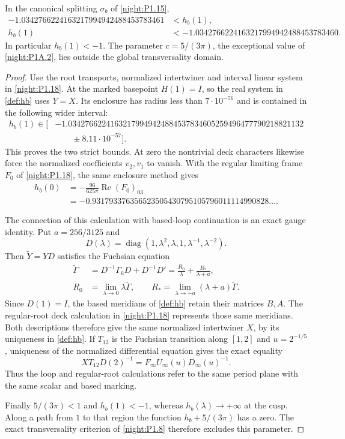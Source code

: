 \begin{theorem}
\hypertarget{tag-02QP}{}\label{night:P1.16}
In the canonical splitting $\sigma_b$ of \cref{night:P1.15},
\[
\begin{aligned}
-1.0342766224163217994942488453783461&<h_b(1),\\
h_b(1)&<-1.0342766224163217994942488453783460.
\end{aligned}
\]
In particular $h_b(1)<-1$. The parameter $c=5/(3\pi)$,
the exceptional value of \cref{night:P1A.2}, lies outside
the global transversality domain.
\end{theorem}
\begin{proof}
Use the root transports, normalized intertwiner and interval
linear system in \cref{night:P1.18}. At the marked basepoint
$H(1)=I$, so the real system in \cref{def:hb} uses $Y=X$.
Its enclosure has radius less than $7\cdot10^{-76}$ and is
contained in the following wider interval:
\[
\begin{aligned}
h_b(1)\in\bigl[&
-1.03427662241632179949424884537834605259496477790218821132\\
&\qquad\mathbin{\pm}8.11\cdot10^{-57}\bigr].
\end{aligned}
\]
This proves the two strict bounds. At zero the nontrivial deck
characters likewise force the normalized coefficients
$v_2,v_1$ to vanish. With the regular limiting frame $F_0$
of \cref{night:P1.18}, the same enclosure method gives
\[
\begin{aligned}
h_b(0)&=-\frac{96}{625\pi}\operatorname{Re}(F_0)_{03}\\
&=-0.931793376356523505430795105796011114990828\ldots .
\end{aligned}
\]

The connection of this calculation with based-loop continuation
is an exact gauge identity. Put $a=256/3125$ and
\[
D(\lambda)=\operatorname{diag}
 (1,\lambda^2,\lambda,1,\lambda^{-1},\lambda^{-2}).
\]
Then $\widetilde Y=YD$ satisfies the Fuchsian equation
\[
\begin{aligned}
\widetilde\Gamma
 &=D^{-1}\Gamma_6D+D^{-1}D'
 =\frac{R_0}{\lambda}+\frac{R_*}{\lambda+a},\\
R_0&=\lim_{\lambda\to0}\lambda\widetilde\Gamma,
\qquad
R_* =\lim_{\lambda\to-a}(\lambda+a)\widetilde\Gamma.
\end{aligned}
\]
Since $D(1)=I$, the based meridians of \cref{def:hb}
retain their matrices $B,A$. The regular-root deck calculation
in \cref{night:P1.18} represents those same meridians.
Both descriptions therefore give the same normalized
intertwiner $X$, by its uniqueness in \cref{def:hb}.
If $T_{12}$ is the Fuchsian transition along $[1,2]$ and
$u=2^{-1/5}$, uniqueness of the normalized differential equation
gives the exact equality
\[
XT_{12}D(2)^{-1}
 =F_\infty U_\infty(u)D_\infty(u)^{-1}.
\]
Thus the loop and regular-root calculations refer to the same
period plane with the same scalar and based marking.

Finally $5/(3\pi)<1$ and $h_b(1)<-1$, whereas
$h_b(\lambda)\to+\infty$ at the cusp. Along a path from $1$
to that region the function $h_b+5/(3\pi)$ has a zero.
The exact transversality criterion of \cref{night:P1.8}
therefore excludes this parameter.
\end{proof}
